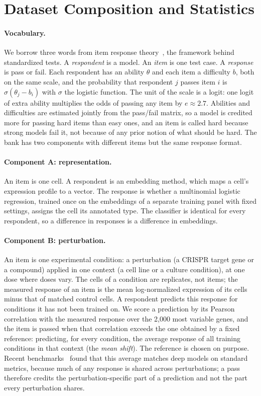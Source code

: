 \documentclass[11pt]{article}
\begin{document}
\section{Dataset Composition and Statistics}
\label{sec:data}

\paragraph{Vocabulary.}
We borrow three words from item response theory~\cite{lord1980}, the framework behind standardized
tests. A \emph{respondent} is a model. An \emph{item} is one test case. A
\emph{response} is pass or fail. Each respondent has an ability $\theta$ and each
item a difficulty $b$, both on the same scale, and the probability that respondent
$j$ passes item $i$ is $\sigma(\theta_j-b_i)$ with $\sigma$ the logistic function.
The unit of the scale is a logit: one logit of extra ability multiplies the odds of
passing any item by $e\approx2.7$. Abilities and difficulties are estimated jointly
from the pass/fail matrix, so a model is credited more for passing hard items than
easy ones, and an item is called hard because strong models fail it, not because of
any prior notion of what should be hard. The bank has two components with different
items but the same response format.

\paragraph{Component A: representation.}
An item is one cell. A respondent is an embedding method, which maps a cell's
expression profile to a vector. The response is whether a multinomial logistic
regression, trained once on the embeddings of a separate training panel with fixed
settings, assigns the cell its annotated type. The classifier is identical for every
respondent, so a difference in responses is a difference in embeddings.

\paragraph{Component B: perturbation.}
An item is one experimental condition: a perturbation (a CRISPR target gene or a
compound) applied in one context (a cell line or a culture condition), at one dose
where doses vary. The cells of a condition are replicates, not items; the measured
response of an item is the mean log-normalized expression of its cells minus that of
matched control cells. A respondent predicts this response for conditions it has not
been trained on. We score a prediction by its Pearson correlation with the measured
response over the 2,000 most variable genes, and the item is passed when that
correlation exceeds the one obtained by a fixed reference: predicting, for every
condition, the average response of all training conditions in that context (the
\emph{mean shift}). The reference is chosen on purpose. Recent benchmarks~\cite{systema,perturbench,ahlmann2025} found that
this average matches deep models on standard metrics, because much of any response is
shared across perturbations; a pass therefore credits the perturbation-specific part
of a prediction and not the part every perturbation shares.
\end{document}
